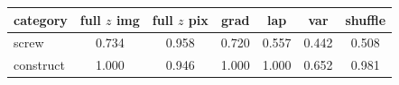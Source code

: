 \setlength{\tabcolsep}{3pt}
\begin{tabular}{@{}lcccccc@{}}
\toprule
category & full $z$ img & full $z$ pix & grad & lap & var & shuffle \\
\midrule
screw & 0.734 & 0.958 & 0.720 & 0.557 & 0.442 & 0.508 \\
construct & 1.000 & 0.946 & 1.000 & 1.000 & 0.652 & 0.981 \\
\bottomrule
\end{tabular}
